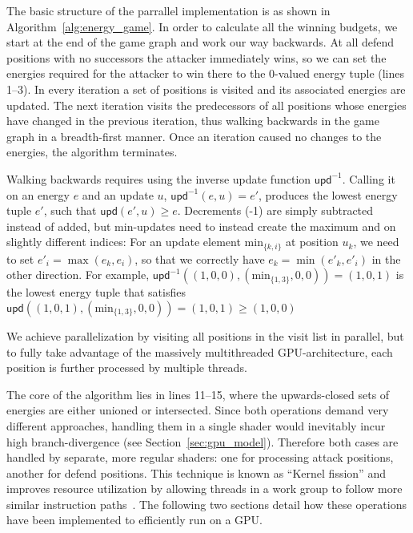 The basic structure of the parrallel implementation
is as shown in Algorithm~\ref{alg:energy_game}.
In order to calculate all the winning budgets,
we start at the end of the game graph and work our way backwards.
At all defend positions with no successors the attacker immediately wins,
so we can set the energies required for the attacker to win there to the
0-valued energy tuple (lines 1--3).
In every iteration a set of positions is visited
and its associated energies are updated.
The next iteration visits the predecessors of all positions whose energies
have changed in the previous iteration, thus walking backwards in the game
graph in a breadth-first manner. Once an iteration caused no changes to the
energies, the algorithm terminates.

Walking backwards requires using the inverse update function
$\mathsf{upd}^{-1}$.
Calling it on an energy $e$ and an update $u$, $\mathsf{upd}^{-1}(e, u) = e'$,
produces the lowest energy tuple $e'$, such that $\mathsf{upd}(e', u) \geq e$.
Decrements (-1) are simply subtracted instead of added,
but $\mathrm{min}$-updates need to instead create the maximum and on slightly
different indices:
For an update element $\mathrm{min}_{\{k, i\}}$ at position $u_k$,
we need to set $e'_i = \max(e_k, e_i)$,
so that we correctly have $e_k = \min(e'_k, e'_i)$ in the other direction.
For example,
$\mathsf{upd}^{-1}((1, 0, 0), (\mathrm{min}_{\{1, 3\}}, 0, 0)) = (1, 0, 1)$
is the lowest energy tuple that satisfies
$\mathsf{upd}((1, 0, 1), (\mathrm{min}_{\{1, 3\}}, 0, 0)) = (1, 0, 1)
    \geq (1, 0, 0)$

We achieve parallelization by visiting all positions in the visit list in
parallel, but to fully take advantage of the massively multithreaded
GPU-architecture, each position is further processed by multiple threads.

The core of the algorithm lies in lines 11--15, where the upwards-closed sets of
energies are either unioned or intersected.
Since both operations demand very different approaches,
handling them in a single shader would inevitably incur high branch-divergence
(see Section~\ref{sec:gpu_model}).
Therefore both cases are handled by separate, more regular shaders:
one for processing attack positions, another for defend positions.
This technique is known as \enquote{Kernel fission}
and improves resource utilization by allowing threads in a work group to follow
more similar instruction paths~\cite{Hijma2023}.
The following two sections detail how these operations have been implemented to
efficiently run on a GPU\@.


